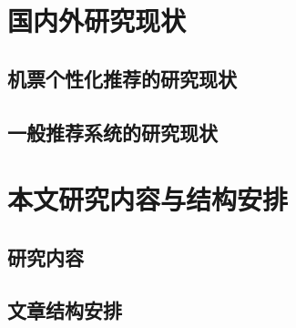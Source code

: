 \section{国内外研究现状}
\subsection{机票个性化推荐的研究现状}
\subsection{一般推荐系统的研究现状}


\section{本文研究内容与结构安排}
\subsection{研究内容}
\subsection{文章结构安排}
